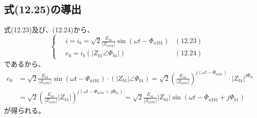 \documentclass[fleqn,11pt,a4paper,dvipdfmx]{jsarticle}
\numberwithin{equation}{section}
\begin{document}
\subsection*{式(12.25)の導出}
式(12.23)及び、(12.24)から、
\begin{equation*}
  \left\{ \,
  \begin{aligned}
     & i = i_b = \sqrt{2} \frac{ E_{in} }{\left| Z_{a1b1} \right|}\sin \left(\omega t - \Phi_{a1b1}\right) & \left(12.23\right) \\
     & e_0 = i_b \left(\left|Z_{b1} \angle \Phi_{b1}\right|\right)                                         & \left(12.24\right)
  \end{aligned}
  \right.
\end{equation*}
であるから、
\begin{align*}
  e_0 & = \sqrt{2} \frac{ E_{in} }{\left| Z_{a1b1} \right|}\sin \left(\omega t - \Phi_{a1b1}\right) \cdot \left(\left|Z_{b1}\right| \angle \Phi_{b1}\right)
  = \sqrt{2} \left(\frac{ E_{in} }{\left| Z_{a1b1} \right|}\right)^{j\left(\omega t - \Phi_{a1b1}\right)} \cdot {\left|Z_{b1}\right|}^{j\Phi_{b1}}          \\
      & = \sqrt{2} \left(\frac{ E_{in} }{\left| Z_{a1b1} \right|} \left|Z_{b1}\right| \right)^ {j\left(\omega t - \Phi_{a1b1} + j\Phi_{b1}\right)}
  = \sqrt{2} \frac{ E_{in} }{\left| Z_{a1b1} \right|} \left|Z_{b1}\right| \sin {\left(\omega t - \Phi_{a1b1} + j\Phi_{b1}\right)}
\end{align*}
が得られる。
\end{document}
